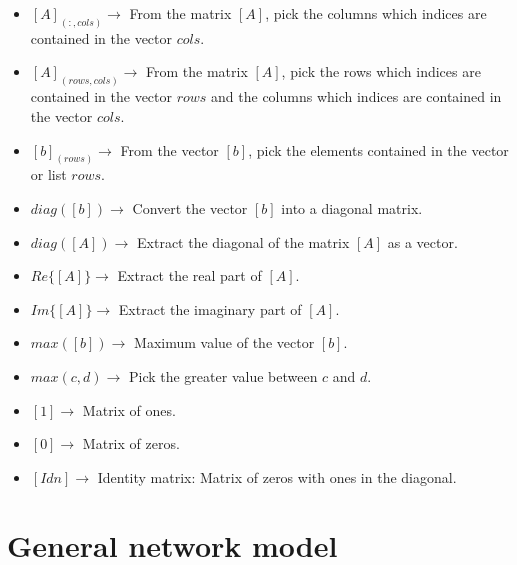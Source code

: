 \documentclass[nols,a4paper,twoside,notoc,fleqn]{tufte-book}
\begin{document}
\begin{fullwidth}
\begin{multicols}{2}
\begin{itemize}
	
	\item $[A]_{(:, cols)} \rightarrow$ From the matrix $[A]$, pick the columns which indices are contained in the vector  $cols$.
	
	
	\item $[A]_{(rows, cols)} \rightarrow$ From the matrix $[A]$, pick the rows which indices are contained in the vector  $rows$ and the columns which indices are contained in the vector  $cols$.
	
	
	\item $[b]_{(rows)} \rightarrow$ From the vector $[b]$, pick the elements contained in the vector or list $rows$.
	
	\item $diag([b]) \rightarrow$ Convert the vector $[b]$ into a diagonal matrix. 
	
	\item $diag([A]) \rightarrow$ Extract the diagonal of the matrix $[A]$ as a vector. 
	
	\item $Re\{ [A] \} \rightarrow$ Extract the real part of $[A]$.
	
	\item $Im \{ [A] \} \rightarrow$ Extract the imaginary part of $[A]$.
	
	\item $max([b]) \rightarrow$ Maximum value of the vector $[b]$.
	
	\item $max(c, d) \rightarrow$ Pick the greater value between $c$ and $d$.
	
	\item $[1]  \rightarrow$ Matrix of ones.

	\item $[0]  \rightarrow$ Matrix of zeros.
	
	\item $[Idn]  \rightarrow$ Identity matrix: Matrix of zeros with ones in the diagonal.
\end{itemize}

\end{multicols}

\end{fullwidth}

\chapter{General network model}
\end{document}
